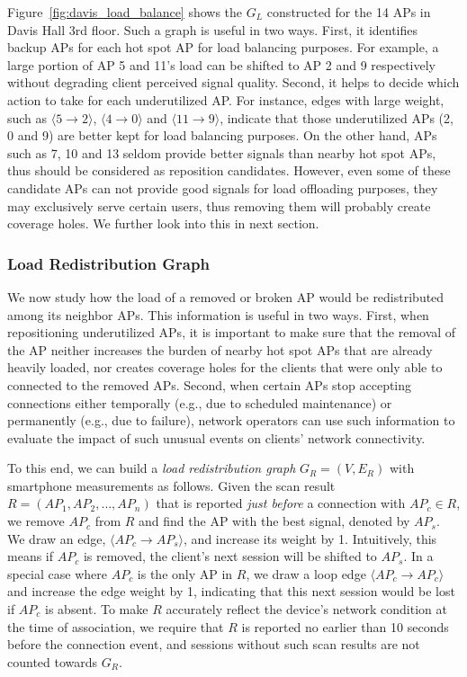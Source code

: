 Figure~\ref{fig:davis_load_balance} shows the $G_L$ constructed for the 14 APs
in Davis Hall 3rd floor. Such a graph is useful in two ways. First, it
identifies backup APs for each hot spot AP for load balancing purposes. For
example, a large portion of AP 5 and 11's load can be shifted to AP 2 and 9
respectively without degrading client perceived signal quality. Second, it helps
to decide which action to take for each underutilized AP. For instance, edges
with large weight, such as $\langle 5 \rightarrow 2 \rangle$, $\langle 4
\rightarrow 0 \rangle$ and $\langle 11 \rightarrow 9 \rangle$, indicate that
those underutilized APs (2, 0 and 9) are better kept for load balancing
purposes. On the other hand, APs such as 7, 10 and 13 seldom provide better
signals than nearby hot spot APs, thus should be considered as reposition
candidates. However, even some of these candidate APs can not provide good
signals for load offloading purposes, they may exclusively serve certain users,
thus removing them will probably create coverage holes. We further look into
this in next section.


\subsubsection{Load Redistribution Graph}
\label{subsec:load_redist}

We now study how the load of a removed or broken AP would be
redistributed among its neighbor APs. This information is useful in two ways.
First, when repositioning underutilized APs, it is important to make sure that
the removal of the AP neither increases the burden of nearby hot spot APs
that are already heavily loaded, nor creates coverage holes for the clients that
were only able to connected to the removed APs. Second, when certain APs stop
accepting connections either temporally (e.g., due to scheduled maintenance) or
permanently (e.g., due to failure), network operators can use such information
to evaluate the impact of such unusual events on clients' network connectivity.

To this end, we can build a \textit{load redistribution graph} $G_R=(V, E_R)$ with
smartphone measurements as follows. Given the \wifi{}
scan result $R=(AP_1, AP_2,\ldots, AP_n)$ that is reported \textit{just before}
a \wifi{} connection with $AP_c \in R$, we remove $AP_c$ from $R$ and find the
AP with the best signal, denoted by $AP_s$. We draw an edge, $\langle AP_c
\rightarrow AP_s \rangle$, and increase its weight by 1. Intuitively, this
means if $AP_c$ is removed, the client's next \wifi{} session will be shifted to
$AP_s$. In a special case where $AP_c$ is the only AP in $R$, we draw a loop
edge $\langle AP_c \rightarrow AP_c \rangle$ and increase the edge weight by 1,
indicating that this next session would be lost if $AP_c$ is absent. To make
$R$ accurately reflect the device's network condition at the time of
association, we require that $R$ is reported no earlier than 10 seconds before the
connection event, and \wifi{} sessions without such scan results are not counted
towards $G_R$.

